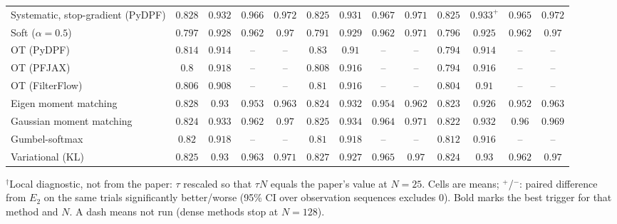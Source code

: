 \begin{table}[ht]
\begin{adjustbox}{max width=\linewidth}
\begin{tabular}{lcccc|cccc|cccc}
Systematic, stop-gradient (PyDPF) & $\mathbf{0.828}$ & $0.932$ & $0.966$ & $0.972$ & $0.825$ & $0.931$ & $0.967$ & $\mathbf{0.971}$ & $0.825$ & $\mathbf{0.933}^{+}$ & $\mathbf{0.965}$ & $0.972$ \\
Soft ($\alpha{=}0.5$) & $\mathbf{0.797}$ & $0.928$ & $\mathbf{0.962}$ & $\mathbf{0.97}$ & $0.791$ & $\mathbf{0.929}$ & $0.962$ & $0.971$ & $0.796$ & $0.925$ & $0.962$ & $\mathbf{0.97}$ \\
OT (PyDPF) & $0.814$ & $\mathbf{0.914}$ & -- & -- & $\mathbf{0.83}$ & $0.91$ & -- & -- & $0.794$ & $\mathbf{0.914}$ & -- & -- \\
OT (PFJAX) & $0.8$ & $\mathbf{0.918}$ & -- & -- & $\mathbf{0.808}$ & $0.916$ & -- & -- & $0.794$ & $0.916$ & -- & -- \\
OT (FilterFlow) & $0.806$ & $0.908$ & -- & -- & $\mathbf{0.81}$ & $\mathbf{0.916}$ & -- & -- & $0.804$ & $0.91$ & -- & -- \\
Eigen moment matching & $\mathbf{0.828}$ & $0.93$ & $0.953$ & $0.963$ & $0.824$ & $\mathbf{0.932}$ & $0.954$ & $\mathbf{0.962}$ & $0.823$ & $0.926$ & $\mathbf{0.952}$ & $0.963$ \\
Gaussian moment matching & $0.824$ & $0.933$ & $0.962$ & $0.97$ & $\mathbf{0.825}$ & $\mathbf{0.934}$ & $0.964$ & $0.971$ & $0.822$ & $0.932$ & $\mathbf{0.96}$ & $\mathbf{0.969}$ \\
Gumbel-softmax & $\mathbf{0.82}$ & $\mathbf{0.918}$ & -- & -- & $0.81$ & $\mathbf{0.918}$ & -- & -- & $0.812$ & $0.916$ & -- & -- \\
Variational (KL) & $0.825$ & $0.93$ & $0.963$ & $0.971$ & $\mathbf{0.827}$ & $0.927$ & $0.965$ & $\mathbf{0.97}$ & $0.824$ & $\mathbf{0.93}$ & $\mathbf{0.962}$ & $\mathbf{0.97}$ \\
\bottomrule
\end{tabular}
\end{adjustbox}
\par\smallskip\parbox{0.95\linewidth}{\footnotesize $^\dagger$Local diagnostic, not from the paper: $\tau$ rescaled so that $\tau N$ equals the paper's value at $N{=}25$. Cells are means; $^{+}$/$^{-}$: paired difference from $E_2$ on the same trials significantly better/worse (95\% CI over observation sequences excludes 0). Bold marks the best trigger for that method and $N$. A dash means not run (dense methods stop at $N{=}128$).}
\end{table}


